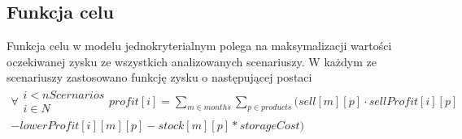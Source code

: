 \subsection{Funkcja celu}
Funkcja celu w modelu jednokryterialnym polega na maksymalizacji wartości oczekiwanej zysku ze wszystkich analizowanych scenariuszy. W każdym ze scenariuszy zastosowano funkcję zysku o następującej postaci
\begin{multline}
\forall{\substack{
			i<nScernarios\\ 
			i \in N}}  
	profit[i] =\sum_{m \in months} \sum_{p \in products}
		(sell[m][p]\cdot sellProfit[i][p] \\ -lowerProfit[i][m][p]-stock[m][p]*storageCost)
\end{multline}
 


